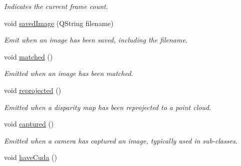 \begin{DoxyCompactItemize}
\begin{DoxyCompactList}\small\item\em Indicates the current frame count. \end{DoxyCompactList}\item 
\hypertarget{class_abstract_stereo_camera_a1e8a9c0d394e1efe15ab8189ec3e2597}{}void \hyperlink{class_abstract_stereo_camera_a1e8a9c0d394e1efe15ab8189ec3e2597}{saved\+Image} (Q\+String filename)\label{class_abstract_stereo_camera_a1e8a9c0d394e1efe15ab8189ec3e2597}

\begin{DoxyCompactList}\small\item\em Emit when an image has been saved, including the filename. \end{DoxyCompactList}\item 
\hypertarget{class_abstract_stereo_camera_ac24eaa1c0c62dae96a176f0eac053414}{}void \hyperlink{class_abstract_stereo_camera_ac24eaa1c0c62dae96a176f0eac053414}{matched} ()\label{class_abstract_stereo_camera_ac24eaa1c0c62dae96a176f0eac053414}

\begin{DoxyCompactList}\small\item\em Emitted when an image has been matched. \end{DoxyCompactList}\item 
\hypertarget{class_abstract_stereo_camera_a955561b40fdaeaf218e32fb117b6aa9b}{}void \hyperlink{class_abstract_stereo_camera_a955561b40fdaeaf218e32fb117b6aa9b}{reprojected} ()\label{class_abstract_stereo_camera_a955561b40fdaeaf218e32fb117b6aa9b}

\begin{DoxyCompactList}\small\item\em Emitted when a disparity map has been reprojected to a point cloud. \end{DoxyCompactList}\item 
\hypertarget{class_abstract_stereo_camera_a28c67fb287ceef7cac927595959f5375}{}void \hyperlink{class_abstract_stereo_camera_a28c67fb287ceef7cac927595959f5375}{captured} ()\label{class_abstract_stereo_camera_a28c67fb287ceef7cac927595959f5375}

\begin{DoxyCompactList}\small\item\em Emitted when a camera has captured an image, typically used in sub-\/classes. \end{DoxyCompactList}\item 
\hypertarget{class_abstract_stereo_camera_ae5165b33283bb368413543aeb863bf88}{}void \hyperlink{class_abstract_stereo_camera_ae5165b33283bb368413543aeb863bf88}{have\+Cuda} ()\label{class_abstract_stereo_camera_ae5165b33283bb368413543aeb863bf88}


\end{DoxyCompactItemize}
